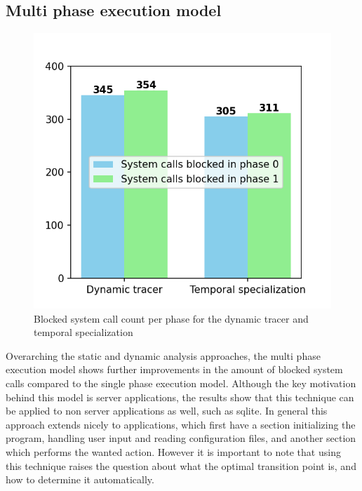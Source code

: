 \subsection {Multi phase execution model}
\begin{figure}
    \centering
    \includegraphics[width=\columnwidth]{./chart_multiphase_syscalls.png}
    \caption{Blocked system call count per phase for the dynamic tracer and temporal specialization}
    \label{fig:block_count_mp}
\end{figure}
Overarching the static and dynamic analysis approaches, the multi phase execution model shows further improvements in the amount of blocked system calls compared to the single phase execution model.
Although the key motivation behind this model is server applications, the results show that this technique can be applied to non server applications as well, such as sqlite.
In general this approach extends nicely to applications, which first have a section initializing the program, handling user input and reading configuration files, and another section which performs the wanted action.
However it is important to note that using this technique raises the question about what the optimal transition point is, and how to determine it automatically.

